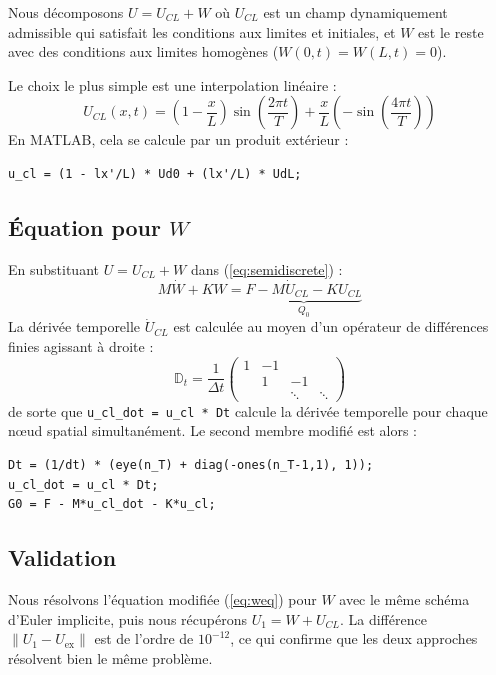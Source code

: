 \documentclass[11pt,a4paper]{article}
\begin{document}
Nous décomposons $U = U_{CL} + W$ où $U_{CL}$ est un champ
\og dynamiquement admissible \fg{} qui satisfait les conditions aux limites et initiales,
et $W$ est le reste avec des conditions aux limites homogènes
($W(0,t) = W(L,t) = 0$).

Le choix le plus simple est une interpolation linéaire :
\begin{equation}
    U_{CL}(x,t) = \left(1 - \frac{x}{L}\right)\sin\!\left(\frac{2\pi t}{T}\right)
    + \frac{x}{L}\left(-\sin\!\left(\frac{4\pi t}{T}\right)\right)
    \label{eq:ucl}
\end{equation}
En MATLAB, cela se calcule par un produit extérieur :
\begin{lstlisting}
u_cl = (1 - lx'/L) * Ud0 + (lx'/L) * UdL;
\end{lstlisting}

\subsection{Équation pour $W$}

En substituant $U = U_{CL} + W$ dans (\ref{eq:semidiscrete}) :
\begin{equation}
    M\dot{W} + KW = \underbrace{F - M\dot{U}_{CL} - KU_{CL}}_{Q_0}
    \label{eq:weq}
\end{equation}
La dérivée temporelle $\dot{U}_{CL}$ est calculée au moyen d'un opérateur de
différences finies agissant à droite :
\begin{equation}
    \mathbb{D}_t = \frac{1}{\Delta t}
    \begin{pmatrix} 1 & -1 & & \\ & 1 & -1 & \\ & & \ddots & \ddots \end{pmatrix}
\end{equation}
de sorte que \texttt{u\_cl\_dot = u\_cl * Dt} calcule la dérivée temporelle pour
chaque nœud spatial simultanément. Le second membre modifié est alors :
\begin{lstlisting}
Dt = (1/dt) * (eye(n_T) + diag(-ones(n_T-1,1), 1));
u_cl_dot = u_cl * Dt;
G0 = F - M*u_cl_dot - K*u_cl;
\end{lstlisting}

\subsection{Validation}

Nous résolvons l'équation modifiée (\ref{eq:weq}) pour $W$ avec le même schéma
d'Euler implicite, puis nous récupérons $U_1 = W + U_{CL}$.
La différence $\|U_1 - U_{\text{ex}}\|$ est de l'ordre de $10^{-12}$,
ce qui confirme que les deux approches résolvent bien le même problème.
\end{document}
